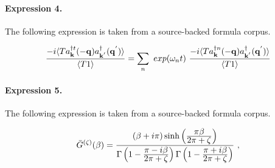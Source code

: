 \documentclass[11pt]{article}
\begin{document}
\paragraph{Expression 4.} The following expression is taken from a source-backed formula corpus.

\begin{align*}\frac{ -i\langle T a^{\dagger t}_{ {\bf{k}} }(-{\bf{q}})a^{\dagger}_{ {\bf{k}}^{'} }({\bf{q}}^{'}) \rangle }{\langle T 1 \rangle} = \sum_{n}\text{ }exp(\omega_{n}t)\text{ }\frac{ -i\langle T a^{\dagger n}_{ {\bf{k}} }(-{\bf{q}})a^{\dagger}_{ {\bf{k}}^{'} }({\bf{q}}^{'}) \rangle }{\langle T 1 \rangle}\end{align*}

\paragraph{Expression 5.} The following expression is taken from a source-backed formula corpus.

\begin{align*}{\bar G}^{(\zeta )}(\beta )={(\beta +i\pi )\sinh\left( {\displaystyle \pi\beta\over \displaystyle 2\pi +\zeta}\right) \over\Gamma \left( 1- {\displaystyle\pi-i\beta \over \displaystyle 2\pi+\zeta}\right)\Gamma \left( 1- {\displaystyle\pi+i\beta \over \displaystyle 2\pi+\zeta}\right)}\ ,\end{align*}
\end{document}
